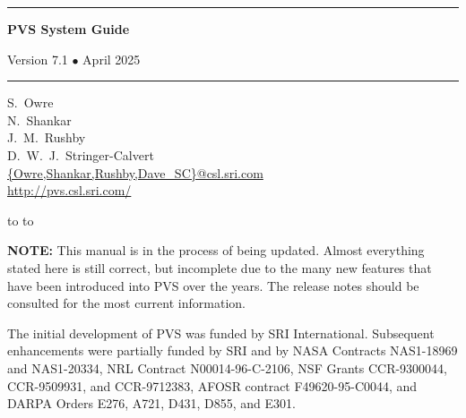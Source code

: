 \documentclass[12pt]{book}
\begin{document}
\begin{titlepage}
\vspace*{1in}
\noindent
\rule[1pt]{\textwidth}{2pt}
\begin{center}
\textbf{\pvstitle PVS System Guide}
\end{center}
\begin{flushright}
{\Large Version 7.1 {\smaller$\bullet$} April 2025}
\end{flushright}
\rule[1in]{\textwidth}{2pt}
\vspace*{2in}
\begin{flushleft}
S.~Owre\\
N.~Shankar\\
J.~M.~Rushby\\
D.~W.~J.~Stringer-Calvert\\
{\smaller\url{{Owre,Shankar,Rushby,Dave_SC}@csl.sri.com}}\\
{\smaller\url{http://pvs.csl.sri.com/}}
\end{flushleft}
\vspace*{1in}
\vbox{\hbox to %
\hbox to }
\end{titlepage}

\pagestyle{fancy}
\renewcommand{\chaptermark}[1]
  {\markboth{\thechapter\quad\em #1}{\thechapter\quad\em #1}}
\renewcommand{\sectionmark}[1]
  {\markboth{\thesection\quad\em #1}{\thesection\quad\em #1}}
\lhead[\thepage]{\rightmark}
\cfoot{}
\rhead[\leftmark]{\thepage}
\thispagestyle{empty}

\newpage

\noindent\textbf{NOTE:} This manual is in the process of being updated.
Almost everything stated here is still correct, but incomplete due to the
many new features that have been introduced into PVS over the years.  The
release notes should be consulted for the most current information.

\vspace*{6in}\noindent
The initial development of PVS was funded by SRI International.
Subsequent enhancements were partially funded by SRI and by NASA
Contracts NAS1-18969 and NAS1-20334, NRL Contract N00014-96-C-2106,
NSF Grants CCR-9300044, CCR-9509931, and CCR-9712383, AFOSR contract
F49620-95-C0044, and DARPA Orders E276, A721, D431, D855, and E301.
\newpage\setcounter{page}{1}
\end{document}
